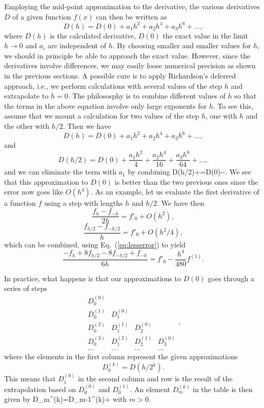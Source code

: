 Employing the mid-point approximation to the derivative, 
the various derivatives $D$ of a given function $f(x)$ can then be written as 
\[
  D(h)=D(0)+a_1h^2+a_2h^4+a_3h^6+\dots,
\]
where $D(h)$ is the calculated derivative, $D(0)$ the exact value 
in the limit $h\rightarrow 0$ and $a_i$ are independent of $h$. 
By choosing smaller and smaller values for $h$, we should
in principle be able to approach the exact value. However, since the derivatives involve differences,
we may easily loose numerical precision as shown in the previous sections.
A possible cure is to apply Richardson's deferred approach, i.e., 
we perform calculations with several values of the step $h$ and extrapolate to $h=0$.
The philososphy is to combine different values of $h$ so that the terms in the above equation involve only
large exponents for $h$. To see this, assume that we mount a calculation for two
values of the step $h$, one with $h$ and the other with $h/2$. 
Then we have
\[
   D(h)=D(0)+ a_1h^2+a_2h^4+a_3h^6+\dots,
\]
and
\[
   D(h/2)=D(0)+ \frac{a_1h^2}{4}+\frac{a_2h^4}{16}+\frac{a_3h^6}{64} +\dots,
\]
and we can eliminate the term with $a_1$ by combining
\be
D(h/2)+=D(0)--.
\label{eq:lesserror}
\ee
We see that this approximation to $D(0)$ is better than the two previous ones since
the error now goes like $O(h^4)$. 
As an example, let us evaluate the first derivative of a function $f$ 
using a step with lengths $h$ and  $h/2$. We have then
\[
   \frac{f_h-f_{-h}}{2h}=f'_0+O(h^2),
\]
\[
   \frac{f_{h/2}-f_{-h/2}}{h}=f'_0+O(h^2/4),
\]
which can be combined, using Eq.\ (\ref{eq:lesserror}) to yield
\[
\frac{-f_h+8f_{h/2}-8f_{-h/2}+f_{-h}}{6h}=f'_0-\frac{h^4}{480}f^{(5)}.
\]

In practice, what happens is that our approximations to $D(0)$ goes through a series of steps
\[
      \begin{array}{ccccc} D_0^{(0)} &  &  &  \\
                           D_0^{(1)} & D_1^{(0)} & &  \\
                           D_0^{(2)} & D_1^{(1)} &D_2^{(0)} &  \\
                           D_0^{(3)} & D_1^{(2)} &D_2^{(1)} & D_3^{(0)}  \\
                           \dots & \dots &\dots & \dots \end{array} ,
\]
where the elements in the first column represent the given approximations
\[
    D_0^{(k)}=D(h/2^k).
\]
This means that $D_1^{(0)}$ in the second column and row is the result
of the extrapolation based on $D_0^{(0)}$ and $D_0^{(1)}$.
An element $D_m^{(k)}$ in the table is then given by
\be
   D_m^{(k)}=D_{m-1}^{(k)}+ 
   \label{eq:richardsson_ext}
\ee
with $m > 0$. 

